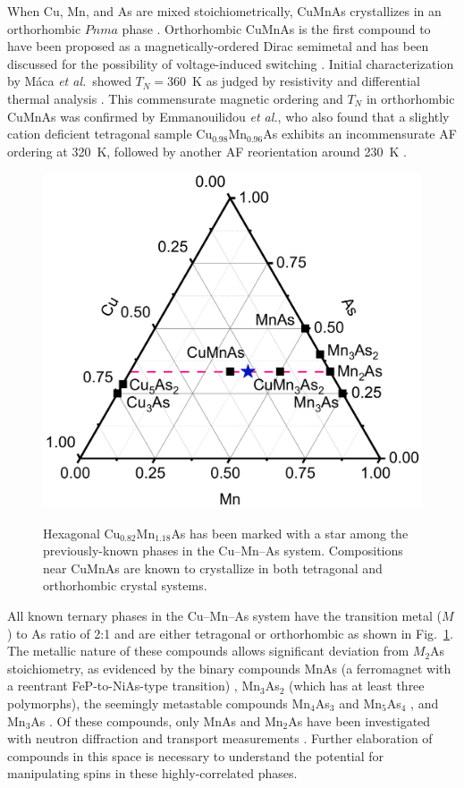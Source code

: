 \documentclass[letterpaper,10pt,doublespacing,edeposit]{uiucthesis2020}
\begin{document}
\begin{mainmatter}
When Cu, Mn, and As are mixed stoichiometrically, CuMnAs crystallizes in an orthorhombic $Pnma$ phase \cite{MacA2012}.
Orthorhombic CuMnAs is the first compound to have been proposed as a magnetically-ordered Dirac semimetal \cite{Tang2016} and has been discussed for the possibility of voltage-induced switching \cite{Kim2018}.
Initial characterization by M\'{a}ca \emph{et al.}\ showed $T_N = 360$~K as judged by resistivity and differential thermal analysis \cite{MacA2012}. This commensurate magnetic ordering and $T_N$ in orthorhombic CuMnAs was confirmed by Emmanouilidou \emph{et al.}, who also found that a slightly cation deficient tetragonal sample Cu$_{0.98}$Mn$_{0.96}$As exhibits an incommensurate AF ordering at 320~K, followed by another AF reorientation around 230~K \cite{emmanouilidou_magnetic_2017}.

\begin{figure}
\centering\includegraphics[width=0.6\columnwidth]{figures/ch5/phase_diagram_cropped.pdf} \\
\caption{\label{fig:phase_diagram}
{\color{black}Hexagonal Cu$_{0.82}$Mn$_{1.18}$As has been marked with a star among the previously-known phases in the Cu--Mn--As system. Compositions near CuMnAs are known to crystallize in both tetragonal and orthorhombic crystal systems.}
} 
\end{figure}

{\color{black} All known ternary phases in the Cu--Mn--As system have the transition metal ($M$) to As ratio of 2:1 and are either tetragonal or orthorhombic as shown in Fig.\ \ref{fig:phase_diagram}.}
The metallic nature of these compounds allows significant deviation from $M_2$As stoichiometry, as evidenced by the binary compounds MnAs (a ferromagnet with a reentrant FeP-to-NiAs-type transition) \cite{Pytlik1985,Schwartz1971,Glazkov2003}, Mn$_3$As$_2$ (which has at least three polymorphs)\cite{Dietrich1990,Moller1993,Hagedorn1994}, the seemingly metastable compounds Mn$_4$As$_3$ and Mn$_5$As$_4$ \cite{Hagedorn1995,Moller1993}, and Mn$_3$As \cite{nowotny_kristallchemische_1951}.
Of these compounds, only MnAs and Mn$_2$As have been investigated with neutron diffraction and transport measurements \cite{Yuzuri1960,Austin1962}.
Further elaboration of compounds in this space is necessary to understand the potential for manipulating spins in these highly-correlated phases.


\end{mainmatter}
\end{document}
